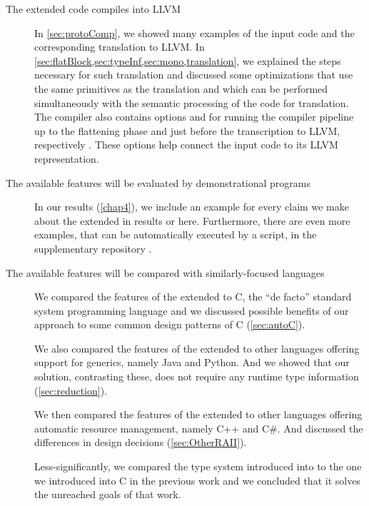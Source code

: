\begin{description}
    \item[The extended \cmm  code compiles into LLVM] In \cref{sec:protoComp}, we showed many examples of the input code and the corresponding translation to LLVM. In \cref{sec:flatBlock,sec:typeInf,sec:mono,translation}, we explained the steps necessary for such translation and discussed some optimizations that use the same primitives as the translation and which can be performed simultaneously with the semantic processing of the code for translation. The compiler also contains options  and  for running the compiler pipeline up to the flattening phase and just before the transcription to LLVM, respectively \cite{klepl2022compiler}. These options help connect the input code to its LLVM representation.

    \item[The available features will be evaluated by demonstrational programs] In our results (\cref{chap4}), we include an example for every claim we make about the extended \cmm in results or here. Furthermore, there are even more examples, that can be automatically executed by a script, in the supplementary repository \cite{klepl2022compiler}.

    \item[The available features will be compared with similarly-focused languages] We compared the features of the extended \cmm to C, the ``de facto'' standard system programming language and we discussed possible benefits of our approach to some common design patterns of C (\cref{sec:autoC}).

    We also compared the features of the extended \cmm to other languages offering support for generics, namely Java and Python. And we showed that our solution, contrasting these, does not require any runtime type information (\cref{sec:reduction}).

    We then compared the features of the extended \cmm to other languages offering automatic resource management, namely C++ and C\#. And discussed the differences in design decisions (\cref{sec:OtherRAII}).

    Less-significantly, we compared the type system introduced into \cmm to the one we introduced into C in the previous work and we concluded that it solves the unreached goals of that work.


\end{description}
